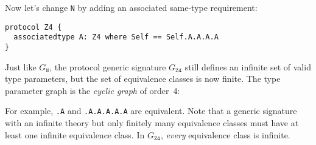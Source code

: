 \documentclass[../generics]{subfiles}
\begin{document}
\begin{example}\label{protocol z4 graph}  Now let's change \texttt{N} by adding an associated same-type requirement:
\begin{Verbatim}
protocol Z4 {
  associatedtype A: Z4 where Self == Self.A.A.A.A
}
\end{Verbatim}
Just like $G_\texttt{N}$, the protocol generic signature $G_\texttt{Z4}$ still defines an infinite set of valid type parameters, but the set of equivalence classes is now finite. The type parameter graph is the \emph{cyclic graph} of order~4:
\begin{center}
\end{center}
For example, \texttt{.A} and \texttt{.A.A.A.A.A} are equivalent. Note that a generic signature with an infinite theory but only finitely many equivalence classes must have at least one infinite equivalence class. In $G_\texttt{Z4}$, \emph{every} equivalence class is infinite.
\end{example}
\end{document}
